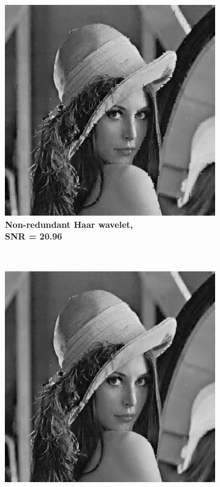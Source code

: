 \begin{figure}
    \centering
    \begin{subfigure}[b]{0.4\textwidth}
        \includegraphics[width=\textwidth]{../src/inpainting/vraag_2_3_wt_haar}
        \caption{\textbf{Non-redundant Haar wavelet, \\ SNR = 20.96} }
        \label{fig:matti_fig_wt_haar}
    \end{subfigure}
    ~ %
    \begin{subfigure}[b]{0.4\textwidth}
        \includegraphics[width=\textwidth]{../src/inpainting/vraag_2_3_rwt_haar}

\end{subfigure}
\end{figure}
